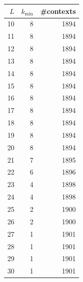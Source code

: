 \begin{tabular}{rrr}%
\hline%
$L$&$k_{\min}$&\#contexts\\%
\hline%
10&8&1894\\%
11&8&1894\\%
12&8&1894\\%
13&8&1894\\%
14&8&1894\\%
15&8&1894\\%
16&8&1894\\%
17&8&1894\\%
18&8&1894\\%
19&8&1894\\%
20&8&1894\\%
21&7&1895\\%
22&6&1896\\%
23&4&1898\\%
24&4&1898\\%
25&2&1900\\%
26&2&1900\\%
27&1&1901\\%
28&1&1901\\%
29&1&1901\\%
30&1&1901\\%
\hline%
\end{tabular}
